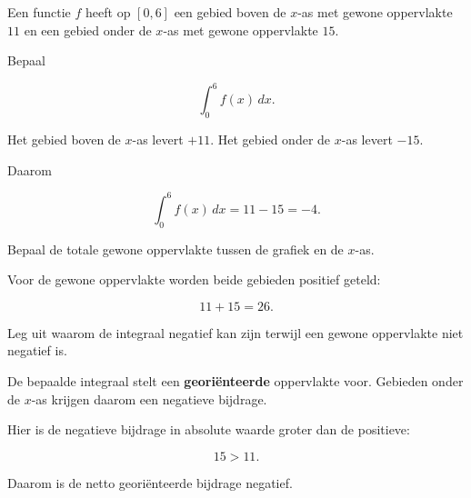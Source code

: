 \documentclass{ximera}
\begin{document}
\begin{oefening}{\oefU\ESS}

Een functie \(f\) heeft op \([0,6]\) een gebied boven de \(x\)-as met
gewone oppervlakte \(11\) en een gebied onder de \(x\)-as met gewone
oppervlakte \(15\).

\begin{question}
Bepaal

\[
\int_0^6f(x)\,dx.
\]

\begin{oplossing}
Het gebied boven de \(x\)-as levert \(+11\). Het gebied onder de
\(x\)-as levert \(-15\).

Daarom

\[
\int_0^6f(x)\,dx
=
11-15
=
\boxed{-4}.
\]
\end{oplossing}
\end{question}

\begin{question}
Bepaal de totale gewone oppervlakte tussen de grafiek en de \(x\)-as.

\begin{oplossing}
Voor de gewone oppervlakte worden beide gebieden positief geteld:

\[
11+15=\boxed{26}.
\]
\end{oplossing}
\end{question}

\begin{question}
Leg uit waarom de integraal negatief kan zijn terwijl een gewone
oppervlakte niet negatief is.

\begin{oplossing}
De bepaalde integraal stelt een \textbf{georiënteerde} oppervlakte voor.
Gebieden onder de \(x\)-as krijgen daarom een negatieve bijdrage.

Hier is de negatieve bijdrage in absolute waarde groter dan de positieve:

\[
15>11.
\]

Daarom is de netto georiënteerde bijdrage negatief.
\end{oplossing}
\end{question}

\end{oefening}


\end{document}
